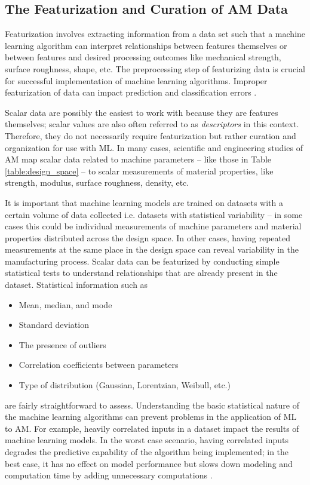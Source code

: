 \subsection{The Featurization and Curation of AM Data}\label{feat}

Featurization involves extracting information from a data set such that a machine learning algorithm can interpret relationships between features themselves or between features and desired processing outcomes like mechanical strength, surface roughness, shape, etc. The preprocessing step of featurizing data is crucial for successful implementation of machine learning algorithms. Improper featurization of data can impact prediction and classification errors \cite{Murdock2020}. 

Scalar data are possibly the easiest to work with because they are features themselves; scalar values are also often referred to as \textit{descriptors} in this context. Therefore, they do not necessarily require featurization but rather curation and organization for use with ML. In many cases, scientific and engineering studies of AM map scalar data related to machine parameters -- like those in Table \ref{table:design_space} -- to scalar measurements of material properties, like strength, modulus, surface roughness, density, etc. 

It is important that machine learning models are trained on datasets with a certain volume of data collected i.e. datasets with statistical variability -- in some cases this could be individual measurements of machine parameters and material properties distributed across the design space. In other cases, having repeated measurements at the same place in the design space can reveal variability in the manufacturing process. Scalar data can be featurized by conducting simple statistical tests to understand relationships that are already present in the dataset. Statistical information such as
\begin{itemize}
	\item Mean, median, and mode
	\item Standard deviation 
	\item The presence of outliers
	\item Correlation coefficients between parameters
	\item Type of distribution (Gaussian, Lorentzian, Weibull, etc.)
\end{itemize}
are fairly straightforward to assess. Understanding the basic statistical nature of the machine learning algorithms can prevent problems in the application of ML to AM. For example, heavily correlated inputs in a dataset impact the results of machine learning models. In the worst case scenario, having correlated inputs degrades the predictive capability of the algorithm being implemented; in the best case, it has no effect on model performance but slows down modeling and computation time by adding unnecessary computations  \cite{Li2018}. 

